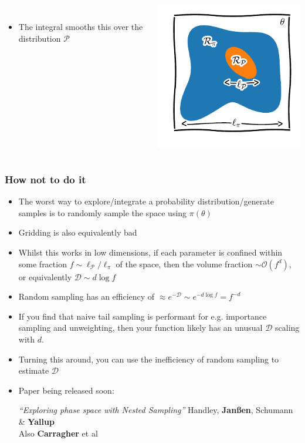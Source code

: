 \documentclass[aspectratio=169]{beamer}
\begin{document}
\begin{frame}
\begin{columns}[onlytextwidth]
\begin{itemize}
\[                \]
            \item The integral smooths this over the distribution $\mathcal{P}$
        \end{itemize}
        \includegraphics{figures/volumes.pdf}
    \end{columns}
\end{frame}

\begin{frame}
    \frametitle{How not to do it}
    \begin{itemize}
        \item The worst way to explore/integrate a probability distribution/generate samples is to randomly sample the space using $\pi(\theta)$~
        \item Gridding is also equivalently bad
        \item Whilst this works in low dimensions, if each parameter is confined within some fraction $f\sim\ell_\mathcal{P}/\ell_\pi$ of the space, then the volume fraction $\sim\mathcal{O}(f^d)$, or equivalently $\mathcal{D}\sim d\log f$ 
        \item Random sampling has an efficiency of $\boxed{\approx e^{-\mathcal{D}} \sim e^{-d\log f} = f^{-d}}$
        \item If you find that naive tail sampling is performant for e.g. importance sampling and unweighting, then your function likely has an unusual $\mathcal{D}$ scaling with $d$. 
        \item Turning this around, you can use the inefficiency of random sampling to estimate $\mathcal{D}$
        \item Paper being released soon:

            \hfill \emph{``Exploring phase space with Nested Sampling''} Handley, \textbf{Jan{\ss}en}, Schumann \& \textbf{Yallup}\\
            Also \textbf{Carragher} et al~
    \end{itemize}
\end{frame}
\end{document}
